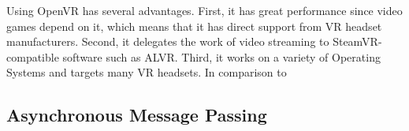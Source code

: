 Using OpenVR has several advantages. First, it has great performance since video games depend on it, which means that it has direct support from VR headset manufacturers. Second, it delegates the work of video streaming to SteamVR-compatible software such as ALVR. Third, it works on a variety of Operating Systems and targets many VR headsets. In comparison to \cite{arunachalam2022holodex} 

\subsection{Asynchronous Message Passing}
